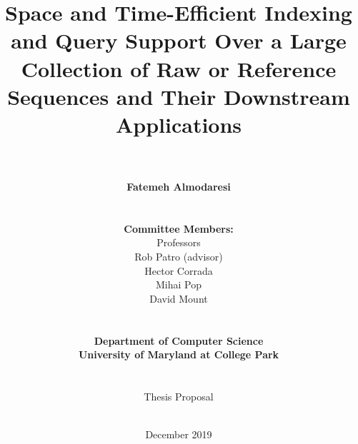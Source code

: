 \documentclass[12pt, letterpaper, twoside]{report}
\title{Space and Time-Efficient Indexing and Query Support Over a Large Collection of Raw or Reference Sequences and Their Downstream Applications}
\author{\\ \\ \textbf{Fatemeh Almodaresi} \\ \\ \\ \textbf{Committee Members:} \\ Professors \\ Rob Patro (advisor) \\ Hector Corrada \\ Mihai Pop \\ David Mount \\ \\ \\ \textbf{Department of Computer Science} \\ \textbf{University of Maryland at College Park} \\ \\ \\ Thesis Proposal \\ \\ }
\date{ December 2019}
\begin{document}
\begin{titlepage}
\maketitle
\end{titlepage}
 


\newpage

\tableofcontents

\newpage










%
\end{document}
